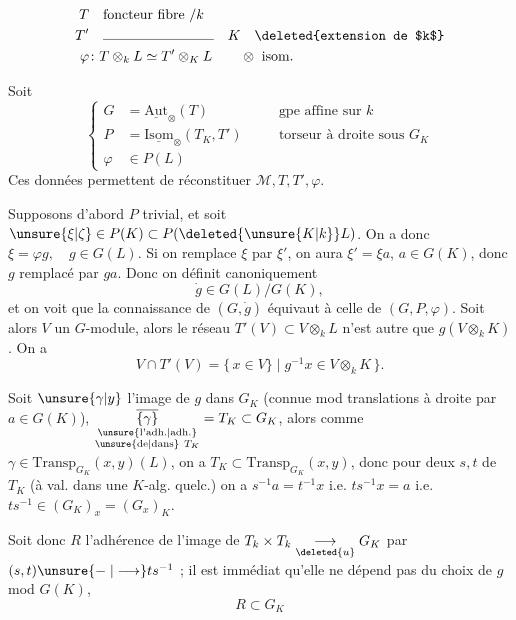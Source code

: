 \[
\begin{aligned}
T&\quad\text{foncteur fibre }/k\\
T'&\quad\rule{2.8cm}{.35pt}\quad K\quad\text{\deleted{extension de $k$}}\\
\varphi&\colon T\otimes_k L\simeq T'\otimes_K L\qquad\otimes\ \text{isom.}
\end{aligned}
\]

Soit
\[
\left\{\begin{aligned}
G&=\underline{\mathrm{Aut}}_{\otimes}(T)&\quad&\text{gpe affine sur }k\\
P&=\underline{\mathrm{Isom}}_{\otimes}(T_K,T')&&\text{torseur à droite sous }G_K\\
\varphi&\in P(L)
\end{aligned}\right.
\]
Ces données permettent de réconstituer $\mathcal M,T,T',\varphi$.

Supposons d'abord $P$ trivial, et soit $\unsure{\xi|\zeta}\in P(K)\subset P(\deleted{\unsure{K|k}}L)$. On a donc $\xi=\varphi g,\quad g\in G(L)$. Si on remplace $\xi$ par $\xi'$, on aura $\xi'=\xi a$, $a\in G(K)$, donc $g$ remplacé par $ga$. Donc on définit canoniquement
\[
\dot g\in G(L)/G(K),
\]
et on voit que la connaissance de $(G,\dot g)$ équivaut à celle de $(G,P,\varphi)$. Soit alors $V$ un $G$-module, alors le réseau $T'(V)\subset V\otimes_k L$ n'est autre que $g(V\otimes_k K)$. On a
\[
V\cap T'(V)=\{\,x\in V\}\mid g^{-1}x\in V\otimes_k K\,\}.
\]

  Soit $\unsure{\gamma|y}$ l'image de $g$ dans $G_K$ (connue mod translations à droite par $a\in G(K)$), $\underset{\substack{\text{\unsure{l'adh.|adh.}}\\\text{\unsure{de|dans}}\ T_K}}{\overline{\{\gamma\}}}=T_K\subset G_K$,  alors  comme  $\gamma\in\mathrm{Transp}_{G_K}(x,y)(L)$, on a $T_K\subset\mathrm{Transp}_{G_K}(x,y)$,  donc pour deux   $s,t$  de $T_K$ (à val. dans une $K$-alg. quelc.) on a $s^{-1}a=t^{-1}x$ i.e. $ts^{-1}x=a$ i.e. $ts^{-1}\in(G_K)_x=(G_x)_K$.

Soit donc $R$ \unsure{:} l'adhérence de l'image de $T_k\times T_k\underset{\deleted{u}}{\longrightarrow}G_K$ par $(s,t)\unsure{\mathrel{-}|\longrightarrow}ts^{-1}$ ; il est immédiat qu'elle ne dépend pas du choix de $g$ mod $G(K)$, 
\[
\boxed{R\subset G_K}
\]
{\centering \textsc{ }\\
\textit{ }\par}


